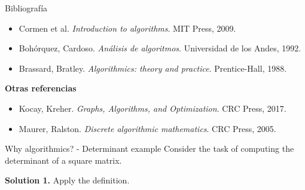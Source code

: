 \documentclass{beamer}
\begin{document}
%

\begin{frame}{Bibliografía}
\begin{itemize}
    \item Cormen et al. \textit{Introduction to algorithms}. MIT Press, 2009.
    \item Bohórquez, Cardoso. \textit{Análisis de algoritmos}. Universidad de los Andes, 1992. \pause
    \item Brassard, Bratley. \textit{Algorithmics: theory and practice}. Prentice-Hall, 1988. \pause \smiley\smiley
\end{itemize}\pause

\bigskip

\textbf{Otras referencias}

\begin{itemize}
    \item Kocay, Kreher. \textit{Graphs, Algorithms, and Optimization}. CRC Press, 2017.
    \item Maurer, Ralston. \textit{Discrete algorithmic mathematics}. CRC Press, 2005.
\end{itemize}
\end{frame}

%

\begin{frame}{Why algorithmics? - Determinant example}
	Consider the task of computing the determinant of a square matrix.

	\bigskip

	\textbf{Solution 1.} Apply the definition.

	
\end{frame}
\end{document}
